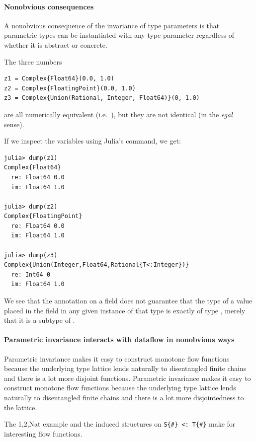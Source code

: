 \documentclass[pldi]{sigplanconf-pldi15}
\begin{document}
\paragraph{Nonobvious consequences}

A nonobvious consequence of the invariance of type parameters is that
parametric types can be instantiated with any type parameter regardless of
whether it is abstract or concrete.

The three  numbers

\begin{verbatim}
z1 = Complex{Float64}(0.0, 1.0)
z2 = Complex{FloatingPoint}(0.0, 1.0)
z3 = Complex{Union(Rational, Integer, Float64)}(0, 1.0)
\end{verbatim}

are all numerically equivalent (i.e.\ ), but they are not
identical (in the \textit{egal} sense).

If we inspect the variables using Julia's  command, we get:

\begin{verbatim}
julia> dump(z1)
Complex{Float64} 
  re: Float64 0.0
  im: Float64 1.0

julia> dump(z2)
Complex{FloatingPoint} 
  re: Float64 0.0
  im: Float64 1.0

julia> dump(z3)
Complex{Union(Integer,Float64,Rational{T<:Integer})} 
  re: Int64 0
  im: Float64 1.0

\end{verbatim}

We see that the  annotation on a field does not guarantee that the
type of a value placed in the field in any given instance of that type is
exactly of type , merely that it is a subtype of .


\paragraph{Parametric invariance interacts with dataflow in nonobvious ways}
Parametric invariance makes it easy to construct monotone flow functions
because the underlying type lattice lends naturally to disentangled finite
chains and there is a lot more disjoint functions.
Parametric invariance makes it easy to construct monotone flow functions
because the underlying type lattice lends naturally to disentangled finite
chains and there is a lot more disjointedness to the lattice.


The 1,2,Nat example and the induced structures on \verb|S{#} <: T{#}| make for
interesting flow functions.
\end{document}
